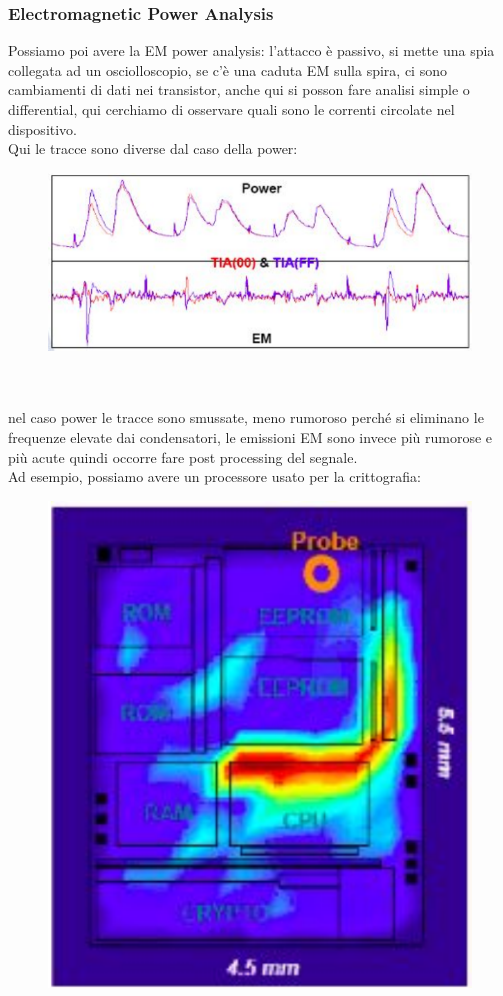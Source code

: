 \documentclass[oneside, 12pt]{extbook}
\begin{document}
\subsubsection{Electromagnetic Power Analysis}
Possiamo poi avere la EM power analysis: l'attacco è passivo, si mette una spia collegata ad un osciolloscopio, se c'è una caduta EM sulla spira, ci sono cambiamenti di dati nei transistor, anche qui si posson fare analisi simple o differential, qui cerchiamo di osservare quali sono le correnti circolate nel dispositivo.
\\Qui le tracce sono diverse dal caso della power:\\
\begin{figure}[!h]
	\includegraphics[scale=0.4]{immagini/hardware/power_trace.png}
\end{figure}
\\\\nel caso power le tracce sono smussate, meno rumoroso perché si eliminano le frequenze elevate dai condensatori, le emissioni EM sono invece più rumorose e più acute quindi occorre fare post processing del segnale.
\\Ad esempio, possiamo avere un processore usato per la crittografia:\\
\begin{figure}[!h]
	\includegraphics[scale=0.4]{immagini/hardware/em_anal_proc.png}
\end{figure}
\end{document}
